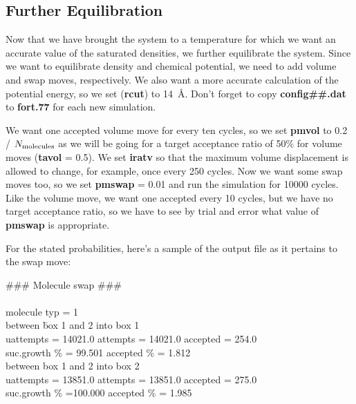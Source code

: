 \documentclass[12pt,letterpaper]{article}
\begin{document}
{{{{{{{\subsection{Further Equilibration}

\noindent Now that we have brought the system to a temperature for which
we want an accurate value of the saturated densities, we further equilibrate the system.
Since we want to equilibrate density and chemical potential, we need to add volume and swap moves, respectively.  We also want a more accurate
calculation of the potential energy, so we set ({\bf rcut}) to
14~{\AA}.  Don't forget to copy {\bf config\#\#.dat} to {\bf fort.77} for each
new simulation.

\noindent We want one accepted volume move for every ten
cycles, so we set {\bf pmvol} to 0.2 / $N_{\rm molecules}$ as
we will be going for a target acceptance ratio of 50\% for volume
moves ({\bf tavol} = 0.5).  We set {\bf iratv} so that the maximum volume
displacement is allowed to change, for example, once every 250 cycles.  
Now we want some swap moves too, so we set {\bf pmswap} = 0.01 and run
the simulation for 10000 cycles.  Like the volume move, we want one
accepted every 10 cycles, but we have no target acceptance ratio, so
we have to see by trial and error what value of {\bf pmswap} is
appropriate.  

\noindent For the stated probabilities, here's a sample of the output
file as it pertains to the swap move:

{\bf
\begin{tabbing}
\#\#\# Molecule swap       \#\#\# \\
\\
 molecule typ =   \hskip 24pt        1 \\
between \= box  1 and  2 into box 1\\
   \> uattempts =    14021.0 attempts = 14021.0   accepted =   254.0\\
 suc.growth \% = 99.501   accepted \% =  1.812\\
between box  1 and  2 into box 2\\
   \>   uattempts =    13851.0 attempts = 13851.0   accepted =    275.0\\
 suc.growth \% =100.000   accepted \% =  1.985\\
\end{tabbing}
}

}}}}}}}
\end{document}
